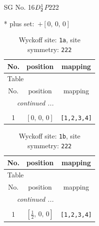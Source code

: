 \documentclass[fleqn,8pt]{jsarticle}
\begin{document}
\setcounter{MaxMatrixCols}{32}

\renewcommand{\tablename}{Table~}
\renewcommand{\figurename}{Figure~}
\begin{center}
\LARGE
SG No. 16\quad$D_{\rm 2}^{1}$\quad$P222$\quad[ orthorhombic ]
\end{center}
* plus set:\,\,\,$+\left[ 0,\, 0,\, 0 \right]$
\renewcommand{\arraystretch}{1.2}
\begin{longtable}{ccc}
\caption{Wyckoff site: {\tt 1a}, site symmetry: {\tt 222}}
 \\
 \hline \hline
No. & position & mapping \\ \hline \endfirsthead

\multicolumn{2}{l}{\tablename\ \thetable{}} \\
 \hline \hline
No. & position & mapping \\ \hline \endhead

 \hline \hline
\multicolumn{2}{r}{\footnotesize\it continued ...} \\ \endfoot

 \hline \hline
\multicolumn{2}{r}{} \\ \endlastfoot

1 & $\left[ 0,\, 0,\, 0 \right]$ & {\tt [1,2,3,4]} \\
\end{longtable}
\renewcommand{\arraystretch}{1.2}
\begin{longtable}{ccc}
\caption{Wyckoff site: {\tt 1b}, site symmetry: {\tt 222}}
 \\
 \hline \hline
No. & position & mapping \\ \hline \endfirsthead

\multicolumn{2}{l}{\tablename\ \thetable{}} \\
 \hline \hline
No. & position & mapping \\ \hline \endhead

 \hline \hline
\multicolumn{2}{r}{\footnotesize\it continued ...} \\ \endfoot

 \hline \hline
\multicolumn{2}{r}{} \\ \endlastfoot

1 & $\left[ \frac{1}{2},\, 0,\, 0 \right]$ & {\tt [1,2,3,4]} \\
\end{longtable}
\renewcommand{\arraystretch}{1.2}
\end{document}
